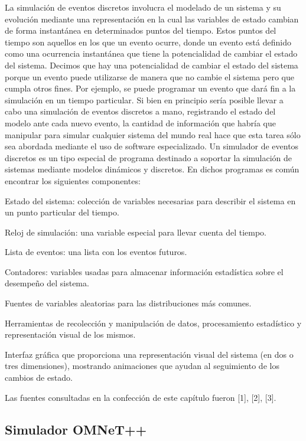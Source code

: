 \documentclass[]{article}
\begin{document}
La simulación de eventos discretos involucra el modelado de un sistema y su
evolución mediante una representación en la cual las variables de estado
cambian de forma instantánea en determinados puntos del tiempo. Estos puntos
del tiempo son aquellos en los que un evento ocurre, donde un evento está
definido como una ocurrencia instantánea que tiene la potencialidad de cambiar
el estado del sistema. Decimos que hay una potencialidad de cambiar el estado
del sistema porque un evento puede utilizarse de manera que no cambie el
sistema pero que cumpla otros fines. Por ejemplo, se puede programar un evento
que dará fin a la simulación en un tiempo particular.  Si bien en principio
sería posible llevar a cabo una simulación de eventos discretos a mano,
registrando el estado del modelo ante cada nuevo evento, la cantidad de
información que habría que manipular para simular cualquier sistema del mundo
real hace que esta tarea sólo sea abordada mediante el uso de software
especializado.  Un simulador de eventos discretos es un tipo especial de
programa destinado a soportar la simulación de sistemas mediante modelos
dinámicos y discretos. En dichos programas es común encontrar los siguientes
componentes:


Estado del sistema: colección de variables necesarias para describir el sistema
en un punto particular del tiempo.

Reloj de simulación: una variable especial para llevar cuenta del tiempo.

Lista de eventos: una lista con los eventos futuros.

Contadores: variables usadas para almacenar información estadística sobre el
desempeño del sistema.

Fuentes de variables aleatorias para las distribuciones más comunes.

Herramientas de recolección y manipulación de datos, procesamiento estadístico
y representación visual de los mismos.

Interfaz gráfica que proporciona una representación visual del sistema (en dos
o tres dimensiones), mostrando animaciones que ayudan al seguimiento de los
cambios de estado.

Las fuentes consultadas en la confección de este capítulo fueron [1], [2], [3].

\subsection{Simulador OMNeT++}
\end{document}
